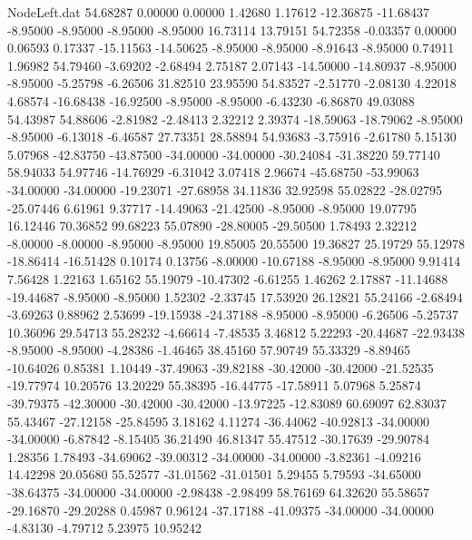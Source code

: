\begin{filecontents}{NodeLeft.dat}
  54.68287    0.00000    0.00000     1.42680    1.17612  -12.36875  -11.68437   -8.95000   -8.95000   -8.95000   -8.95000   16.73114   13.79151
  54.72358   -0.03357    0.00000     0.06593    0.17337  -15.11563  -14.50625   -8.95000   -8.95000   -8.91643   -8.95000    0.74911    1.96982
  54.79460   -3.69202   -2.68494     2.75187    2.07143  -14.50000  -14.80937   -8.95000   -8.95000   -5.25798   -6.26506   31.82510   23.95590
  54.83527   -2.51770   -2.08130     4.22018    4.68574  -16.68438  -16.92500   -8.95000   -8.95000   -6.43230   -6.86870   49.03088   54.43987
  54.88606   -2.81982   -2.48413     2.32212    2.39374  -18.59063  -18.79062   -8.95000   -8.95000   -6.13018   -6.46587   27.73351   28.58894
  54.93683   -3.75916   -2.61780     5.15130    5.07968  -42.83750  -43.87500  -34.00000  -34.00000  -30.24084  -31.38220   59.77140   58.94033
  54.97746  -14.76929   -6.31042     3.07418    2.96674  -45.68750  -53.99063  -34.00000  -34.00000  -19.23071  -27.68958   34.11836   32.92598
  55.02822  -28.02795  -25.07446     6.61961    9.37717  -14.49063  -21.42500   -8.95000   -8.95000   19.07795   16.12446   70.36852   99.68223
  55.07890  -28.80005  -29.50500     1.78493    2.32212   -8.00000   -8.00000   -8.95000   -8.95000   19.85005   20.55500   19.36827   25.19729
  55.12978  -18.86414  -16.51428     0.10174    0.13756   -8.00000  -10.67188   -8.95000   -8.95000    9.91414    7.56428    1.22163    1.65162
  55.19079  -10.47302   -6.61255     1.46262    2.17887  -11.14688  -19.44687   -8.95000   -8.95000    1.52302   -2.33745   17.53920   26.12821
  55.24166   -2.68494   -3.69263     0.88962    2.53699  -19.15938  -24.37188   -8.95000   -8.95000   -6.26506   -5.25737   10.36096   29.54713
  55.28232   -4.66614   -7.48535     3.46812    5.22293  -20.44687  -22.93438   -8.95000   -8.95000   -4.28386   -1.46465   38.45160   57.90749
  55.33329   -8.89465  -10.64026     0.85381    1.10449  -37.49063  -39.82188  -30.42000  -30.42000  -21.52535  -19.77974   10.20576   13.20229
  55.38395  -16.44775  -17.58911     5.07968    5.25874  -39.79375  -42.30000  -30.42000  -30.42000  -13.97225  -12.83089   60.69097   62.83037
  55.43467  -27.12158  -25.84595     3.18162    4.11274  -36.44062  -40.92813  -34.00000  -34.00000   -6.87842   -8.15405   36.21490   46.81347
  55.47512  -30.17639  -29.90784     1.28356    1.78493  -34.69062  -39.00312  -34.00000  -34.00000   -3.82361   -4.09216   14.42298   20.05680
  55.52577  -31.01562  -31.01501     5.29455    5.79593  -34.65000  -38.64375  -34.00000  -34.00000   -2.98438   -2.98499   58.76169   64.32620
  55.58657  -29.16870  -29.20288     0.45987    0.96124  -37.17188  -41.09375  -34.00000  -34.00000   -4.83130   -4.79712    5.23975   10.95242

\end{filecontents}
